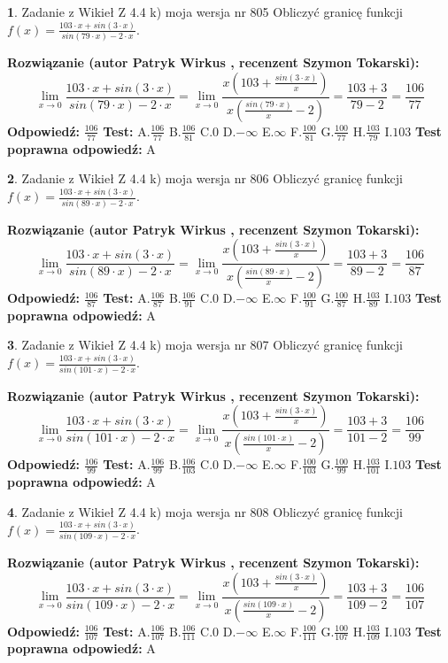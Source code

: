 \documentclass[12pt, a4paper]{article}
\theoremstyle{definition} %
\newtheorem{zad}{}
\newcommand{\zadStart}[1]{\begin{zad}#1\newline}
\newcommand{\zadStop}{\end{zad}}
\newcommand{\rozwStart}[2]{\noindent \textbf{Rozwiązanie (autor #1 , recenzent #2): }\newline}
\newcommand{\rozwStop}{\newline}
\newcommand{\odpStart}{\noindent \textbf{Odpowiedź:}\newline}
\newcommand{\odpStop}{\newline}
\newcommand{\testStart}{\noindent \textbf{Test:}\newline}
\newcommand{\testStop}{\newline}
\newcommand{\kluczStart}{\noindent \textbf{Test poprawna odpowiedź:}\newline}
\newcommand{\kluczStop}{\newline}
\begin{document}
\zadStart{Zadanie z Wikieł Z 4.4 k) moja wersja nr 805}
Obliczyć granicę funkcji $f(x)=\frac{103\cdot x +sin(3\cdot x)}{sin(79\cdot x) -2\cdot x}$.
\zadStop
\rozwStart{Patryk Wirkus}{Szymon Tokarski}
$$\lim\limits_{x\to 0}\frac{103\cdot x +sin(3\cdot x)}{sin(79\cdot x) -2\cdot x}
=\lim\limits_{x\to 0}\frac{x(103+\frac{sin(3\cdot x)}{x})}{x(\frac{sin(79\cdot x)}{x}-2)}
=\frac{103+3}{79-2} = \frac{106}{77}$$
\rozwStop
\odpStart
$\frac{106}{77}$
\odpStop
\testStart
A.$\frac{106}{77}$
B.$\frac{106}{81}$
C.$0$
D.$-\infty$
E.$\infty$
F.$\frac{100}{81}$
G.$\frac{100}{77}$
H.$\frac{103}{79}$
I.$103$
\testStop
\kluczStart
A
\kluczStop



\zadStart{Zadanie z Wikieł Z 4.4 k) moja wersja nr 806}
Obliczyć granicę funkcji $f(x)=\frac{103\cdot x +sin(3\cdot x)}{sin(89\cdot x) -2\cdot x}$.
\zadStop
\rozwStart{Patryk Wirkus}{Szymon Tokarski}
$$\lim\limits_{x\to 0}\frac{103\cdot x +sin(3\cdot x)}{sin(89\cdot x) -2\cdot x}
=\lim\limits_{x\to 0}\frac{x(103+\frac{sin(3\cdot x)}{x})}{x(\frac{sin(89\cdot x)}{x}-2)}
=\frac{103+3}{89-2} = \frac{106}{87}$$
\rozwStop
\odpStart
$\frac{106}{87}$
\odpStop
\testStart
A.$\frac{106}{87}$
B.$\frac{106}{91}$
C.$0$
D.$-\infty$
E.$\infty$
F.$\frac{100}{91}$
G.$\frac{100}{87}$
H.$\frac{103}{89}$
I.$103$
\testStop
\kluczStart
A
\kluczStop



\zadStart{Zadanie z Wikieł Z 4.4 k) moja wersja nr 807}
Obliczyć granicę funkcji $f(x)=\frac{103\cdot x +sin(3\cdot x)}{sin(101\cdot x) -2\cdot x}$.
\zadStop
\rozwStart{Patryk Wirkus}{Szymon Tokarski}
$$\lim\limits_{x\to 0}\frac{103\cdot x +sin(3\cdot x)}{sin(101\cdot x) -2\cdot x}
=\lim\limits_{x\to 0}\frac{x(103+\frac{sin(3\cdot x)}{x})}{x(\frac{sin(101\cdot x)}{x}-2)}
=\frac{103+3}{101-2} = \frac{106}{99}$$
\rozwStop
\odpStart
$\frac{106}{99}$
\odpStop
\testStart
A.$\frac{106}{99}$
B.$\frac{106}{103}$
C.$0$
D.$-\infty$
E.$\infty$
F.$\frac{100}{103}$
G.$\frac{100}{99}$
H.$\frac{103}{101}$
I.$103$
\testStop
\kluczStart
A
\kluczStop



\zadStart{Zadanie z Wikieł Z 4.4 k) moja wersja nr 808}
Obliczyć granicę funkcji $f(x)=\frac{103\cdot x +sin(3\cdot x)}{sin(109\cdot x) -2\cdot x}$.
\zadStop
\rozwStart{Patryk Wirkus}{Szymon Tokarski}
$$\lim\limits_{x\to 0}\frac{103\cdot x +sin(3\cdot x)}{sin(109\cdot x) -2\cdot x}
=\lim\limits_{x\to 0}\frac{x(103+\frac{sin(3\cdot x)}{x})}{x(\frac{sin(109\cdot x)}{x}-2)}
=\frac{103+3}{109-2} = \frac{106}{107}$$
\rozwStop
\odpStart
$\frac{106}{107}$
\odpStop
\testStart
A.$\frac{106}{107}$
B.$\frac{106}{111}$
C.$0$
D.$-\infty$
E.$\infty$
F.$\frac{100}{111}$
G.$\frac{100}{107}$
H.$\frac{103}{109}$
I.$103$
\testStop
\kluczStart
A
\kluczStop
\end{document}
